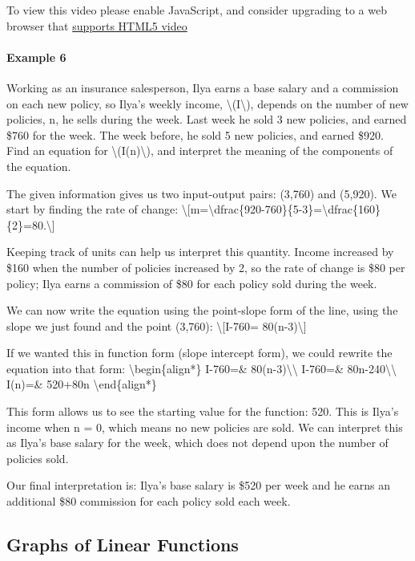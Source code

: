 To view this video please enable JavaScript, and consider upgrading to a
web browser that \href{http://videojs.com/html5-video-support/}{supports
HTML5 video}

\hypertarget{example-6}{%
\paragraph{Example 6}\label{example-6}}

Working as an insurance salesperson, Ilya earns a base salary and a
commission on each new policy, so Ilya's weekly income,
\textbackslash{}(I\textbackslash{}), depends on the number of new
policies, n, he sells during the week. Last week he sold 3 new policies,
and earned \$760 for the week. The week before, he sold 5 new policies,
and earned \$920. Find an equation for
\textbackslash{}(I(n)\textbackslash{}), and interpret the meaning of the
components of the equation.

The given information gives us two input-output pairs: (3,760) and
(5,920). We start by finding the rate of change:
\textbackslash{}{[}m=\textbackslash{}dfrac\{920-760\}\{5-3\}=\textbackslash{}dfrac\{160\}\{2\}=80.\textbackslash{}{]}

Keeping track of units can help us interpret this quantity. Income
increased by \$160 when the number of policies increased by 2, so the
rate of change is \$80 per policy; Ilya earns a commission of \$80 for
each policy sold during the week.

We can now write the equation using the point-slope form of the line,
using the slope we just found and the point (3,760):
\textbackslash{}{[}I-760= 80(n-3)\textbackslash{}{]}

If we wanted this in function form (slope intercept form), we could
rewrite the equation into that form: \textbackslash{}begin\{align*\}
I-760=\& 80(n-3)\textbackslash{}\textbackslash{} I-760=\&
80n-240\textbackslash{}\textbackslash{} I(n)=\& 520+80n
\textbackslash{}end\{align*\}

This form allows us to see the starting value for the function: 520.
This is Ilya's income when n = 0, which means no new policies are sold.
We can interpret this as Ilya's base salary for the week, which does not
depend upon the number of policies sold.

Our final interpretation is: Ilya's base salary is \$520 per week and he
earns an additional \$80 commission for each policy sold each week.

\hypertarget{graphs-of-linear-functions}{%
\subsection{Graphs of Linear
Functions}\label{graphs-of-linear-functions}}

